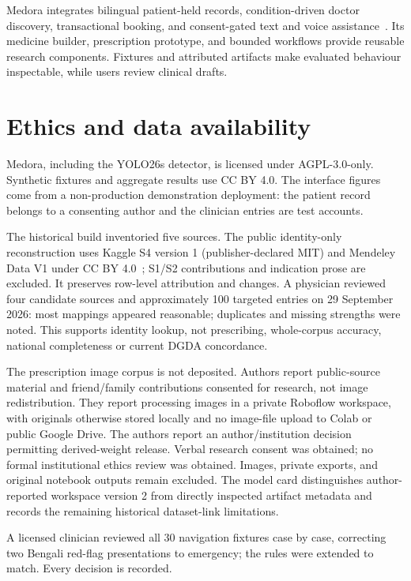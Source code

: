 \documentclass[preprint,12pt,a4paper]{elsarticle}
\begin{document}
Medora integrates bilingual patient-held records, condition-driven doctor discovery,
transactional booking, and consent-gated text and voice assistance~\cite{medorasw}.
Its medicine builder, prescription prototype, and bounded workflows provide reusable
research components. Fixtures and attributed artifacts make evaluated behaviour inspectable,
while users review clinical drafts.

\section*{Ethics and data availability}
\label{sec:ethics}

Medora, including the YOLO26s detector, is licensed under AGPL-3.0-only. Synthetic
fixtures and aggregate results use CC BY 4.0. The interface figures come from a non-production demonstration
deployment: the patient record belongs to a consenting author and the clinician entries are
test accounts.

The historical build inventoried five sources. The public identity-only reconstruction uses
Kaggle S4 version 1 (publisher-declared MIT) and Mendeley Data V1 under CC BY 4.0~\cite{bdmeds};
S1/S2 contributions and indication prose are excluded. It preserves row-level attribution
and changes. A physician reviewed four candidate sources and approximately
100 targeted entries on 29 September 2026: most mappings appeared reasonable; duplicates
and missing strengths were noted. This supports identity lookup, not prescribing,
whole-corpus accuracy, national completeness or current DGDA concordance.

The prescription image corpus is not deposited. Authors report public-source material
and friend/family contributions consented for research, not image redistribution.
They report processing images in a private Roboflow workspace, with originals otherwise
stored locally and no image-file upload to Colab or public Google Drive.
The authors report an author/institution decision permitting derived-weight release.
Verbal research consent was obtained; no formal institutional ethics review was obtained.
Images, private exports, and original notebook outputs remain excluded.
The model card distinguishes author-reported workspace version 2 from directly inspected
artifact metadata and records the remaining historical dataset-link limitations.

A licensed clinician reviewed all 30 navigation fixtures case by case, correcting two
Bengali red-flag presentations to emergency; the rules were extended to match. Every
decision is recorded.
\end{document}
